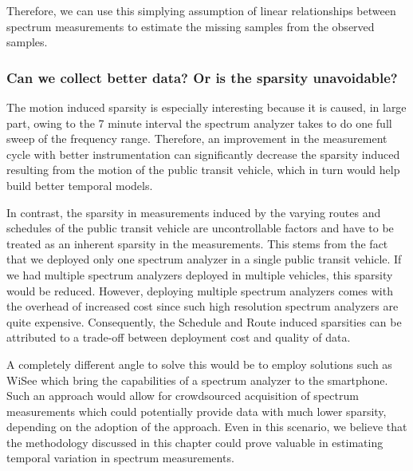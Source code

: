 Therefore, we can use this simplying assumption of linear relationships between spectrum measurements to estimate the missing samples from the observed samples.

\subsubsection{Can we collect better data? Or is the sparsity unavoidable?}

The motion induced sparsity is especially interesting because it is caused, in large part, owing to the 7 minute interval the spectrum analyzer takes to do one full sweep of the frequency range.
 Therefore, an improvement in the measurement cycle with better instrumentation can significantly decrease the sparsity induced resulting from the motion of the public transit vehicle, which in turn would help build better temporal models.

In contrast, the sparsity in measurements induced by the varying routes and schedules of the public transit vehicle are uncontrollable factors and have to be treated as an inherent sparsity in the measurements.
 This stems from the fact that we deployed only one spectrum analyzer in a single public transit vehicle.
 If we had multiple spectrum analyzers deployed in multiple vehicles, this sparsity would be reduced.
 However, deploying multiple spectrum analyzers comes with the overhead of increased cost since such high resolution spectrum analyzers are quite expensive.
 Consequently, the Schedule and Route induced sparsities can be attributed to a trade-off between deployment cost and quality of data.

A completely different angle to solve this would be to employ solutions such as WiSee \cite{WiSee} which bring the capabilities of a spectrum analyzer to the smartphone.
 Such an approach would allow for crowdsourced acquisition of spectrum measurements which could potentially provide data with much lower sparsity, depending on the adoption of the approach.
 Even in this scenario, we believe that the methodology discussed in this chapter could prove valuable in estimating temporal variation in spectrum measurements.

